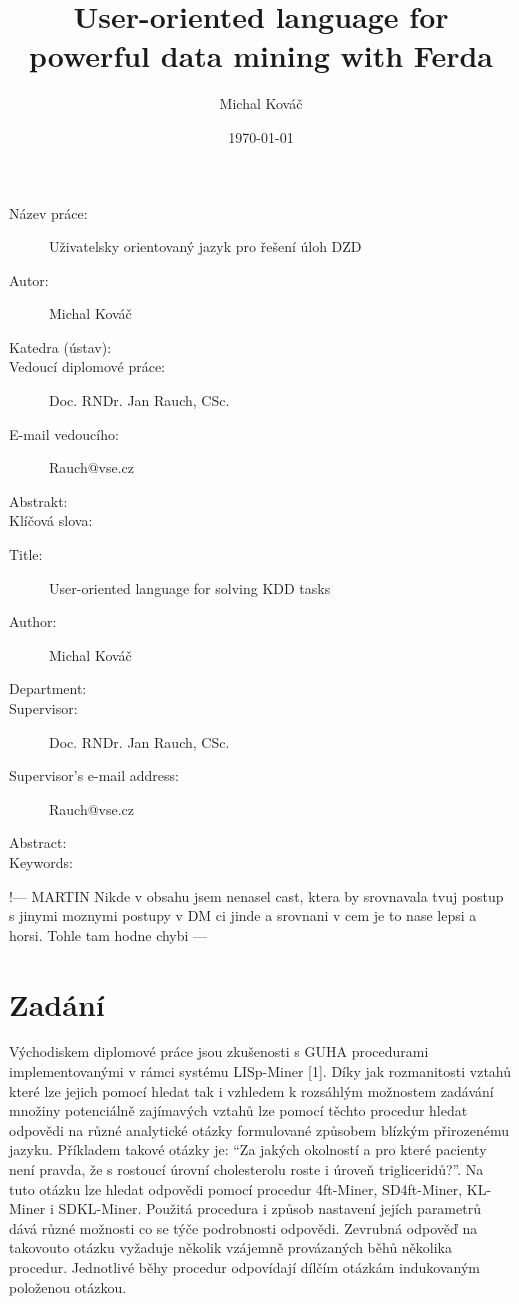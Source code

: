 \documentclass[a4paper,12pt]{book}
\author{Michal Kováč}
\title{User-oriented language for powerful data mining with Ferda}
\date{\today}
\newcommand{\uv}[1]{``#1''}
\begin{document}
\maketitle

\begin{description}
 \item [Název práce:] Uživatelsky orientovaný jazyk pro řešení úloh DZD
 \item [Autor:] Michal Kováč
 \item [Katedra (ústav):]
 \item [Vedoucí diplomové práce:] Doc. RNDr. Jan Rauch, CSc.
 \item [E-mail vedoucího:] Rauch@vse.cz
 \item [Abstrakt:]
 \item [Klíčová slova:]
\end{description}

\medskip

\begin{description}
 \item [Title:] User-oriented language for solving KDD tasks
 \item [Author:] Michal Kováč
 \item [Department:]
 \item [Supervisor:] Doc. RNDr. Jan Rauch, CSc.
 \item [Supervisor's e-mail address:] Rauch@vse.cz
 \item [Abstract:]
 \item [Keywords:]
\end{description}
\newpage

\tableofcontents

!--- MARTIN Nikde v obsahu jsem nenasel cast, ktera by srovnavala tvuj postup s jinymi moznymi postupy v DM ci jinde a srovnani v cem je to nase lepsi a horsi. Tohle tam hodne chybi ---

\section*{Zadání}
Východiskem diplomové práce jsou zkušenosti s GUHA procedurami implementovanými v rámci systému LISp-Miner [1]. Díky jak rozmanitosti vztahů které lze jejich pomocí hledat tak i vzhledem k rozsáhlým možnostem zadávání množiny potenciálně zajímavých vztahů lze pomocí těchto procedur hledat odpovědi na různé analytické otázky formulované způsobem blízkým přirozenému jazyku. Příkladem takové otázky je: \uv{Za jakých okolností a pro které pacienty není pravda, že s rostoucí úrovní cholesterolu roste i úroveň trigliceridů?}. Na tuto otázku lze hledat odpovědi pomocí procedur 4ft-Miner, SD4ft-Miner, KL-Miner i SDKL-Miner. Použitá procedura i způsob nastavení jejích parametrů dává různé možnosti co se týče podrobnosti odpovědi. Zevrubná odpověď na takovouto otázku vyžaduje několik vzájemně provázaných běhů několika procedur. Jednotlivé běhy procedur odpovídají dílčím otázkám indukovaným položenou otázkou.
\end{document}

